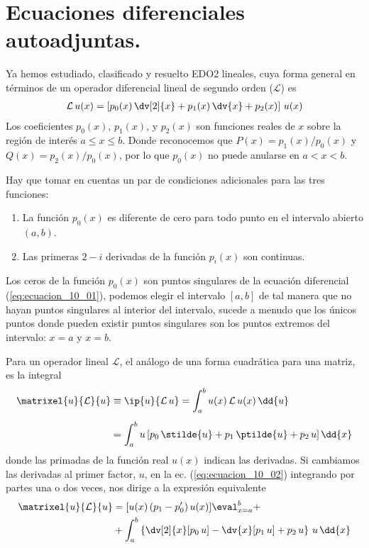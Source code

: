 \section{Ecuaciones diferenciales autoadjuntas.}
Ya hemos estudiado, clasificado y resuelto EDO2 lineales, cuya forma general en términos de un operador diferencial lineal de segundo orden ($\mathcal{L}$) es
\begin{align}
\mathcal{L} \, u(x) = \left[ p_{0}(x) \, \dv[2]{x} + p_{1}(x) \, \dv{x} + p_{2}(x) \right] \, u(x)
\label{eq:ecuacion_10_01}
\end{align}
Los coeficientes $p_{0} (x)$, $p_{1} (x)$, y $p_{2} (x)$ son funciones reales de $x$ sobre la región de interés $a \leq x \leq b$. Donde reconocemos que $P(x) = p_{1}(x)/p_{0}(x)$ y $Q(x)= p_{2}(x)/p_{0}(x)$, por lo que $p_{0}(x)$ no puede anularse en $a < x < b$.
\par
Hay que tomar en cuentas un par de condiciones adicionales para las tres funciones:
\begin{enumerate}
\item La función $p_{0}(x)$ es diferente de cero para todo punto en el intervalo abierto $(a, b)$.
\item Las primeras $2-i$ derivadas de la función $p_{i}(x)$ son continuas.
\end{enumerate}
Los ceros de la función $p_{0}(x)$ son puntos singulares de la ecuación diferencial (\ref{eq:ecuacion_10_01}), podemos elegir el intervalo $[a, b]$ de tal manera que no hayan puntos singulares al interior del intervalo, sucede a menudo que los únicos puntos donde pueden existir puntos singulares son los puntos extremos del intervalo: $x = a$ y $x = b$.
\par
Para un operador lineal $\mathcal{L}$, el análogo de una forma cuadrática para una matriz, es la integral
\begin{align}
\begin{aligned}[b]
\matrixel{u}{\mathcal{L}}{u} &\equiv \ip{u}{\mathcal{L} \, u} = \int_{a}^{b} u(x) \, \mathcal{L} \, u(x) \, \dd{u} \\[0.5em]
&= \int_{a}^{b} u \, [ p_{0} \, \stilde{u} + p_{1} \, \ptilde{u} + p_{2} \, u ] \, \dd{x}
\end{aligned}
\label{eq:ecuacion_10_02}
\end{align}
donde las primadas de la función real $u(x)$ indican las derivadas. Si cambiamos las derivadas al primer factor, $u$, en la ec. (\ref{eq:ecuacion_10_02}) integrando por partes una o dos veces, nos dirige a la expresión equivalente
\begin{align}
\begin{aligned}
\matrixel{u}{\mathcal{L}}{u} &= [ u(x) \, ( p_{1} - p_{0}^{\prime} ) \, u(x)] \eval_{x=a}^{b} + \\
&+ \int_{a}^{b} \left\{ \dv[2]{x} [p_{0} \, u] - \dv{x} [p_{1} \, u] + p_{2} \, u \right\} \, u \, \dd{x}
\end{aligned}
\label{eq:ecuacion_10_03}
\end{align}
